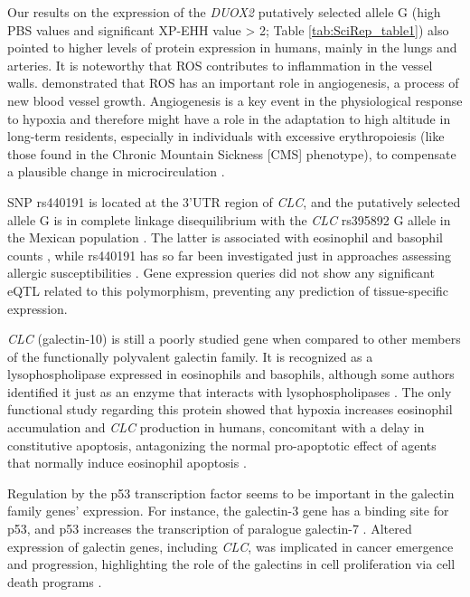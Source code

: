 Our results on the expression of the \textsl{DUOX2} putatively selected allele G (high PBS values and significant XP-EHH value > 2; Table \ref{tab:SciRep_table1}) also pointed to higher levels of protein expression in humans, mainly in the lungs and arteries. It is noteworthy that ROS contributes to inflammation in the vessel walls. \cite{kim_oxidative_2014} demonstrated that ROS has an important role in angiogenesis, a process of new blood vessel growth. Angiogenesis is a key event in the physiological response to hypoxia and therefore might have a role in the adaptation to high altitude in long-term residents, especially in individuals with excessive erythropoiesis (like those found in the Chronic Mountain Sickness [CMS] phenotype), to compensate a plausible change in microcirculation \cite{ge_b-type_2011,buroker_akt3_2012}.

SNP rs440191 is located at the 3'UTR region of \textsl{CLC}, and the putatively selected allele G is in complete linkage disequilibrium with the \textsl{CLC} rs395892 G allele in the Mexican population \cite{the_1000_genomes_project_consortium_integrating_2014}. The latter is associated with eosinophil and basophil counts \cite{1000_genomes_project_consortium_global_2015}, while rs440191 has so far been investigated just in approaches assessing allergic susceptibilities \cite{astle_allelic_2016}. Gene expression queries did not show any significant eQTL related to this polymorphism, preventing any prediction of tissue-specific expression.

\textsl{CLC} (galectin-10) is still a poorly studied gene when compared to other members of the functionally polyvalent galectin family. It is recognized as a lysophospholipase expressed in eosinophils and basophils, although some authors identified it just as an enzyme that interacts with lysophospholipases \cite{ackerman_charcot-leyden_2002}. The only functional study regarding this protein showed that hypoxia increases eosinophil accumulation and \textsl{CLC} production in humans, concomitant with a delay in constitutive apoptosis, antagonizing the normal pro-apoptotic effect of agents that normally induce eosinophil apoptosis \cite{porter_hypoxia_2017}.

Regulation by the p53 transcription factor seems to be important in the galectin family genes’ expression. For instance, the galectin-3 gene has a binding site for p53, and p53 increases the transcription of paralogue galectin-7 \cite{polyak_model_1997,raimond_second_1995,cooper_galectinomics_2002}. Altered expression of galectin genes, including \textsl{CLC}, was implicated in cancer emergence and progression, highlighting the role of the galectins in cell proliferation via cell death programs \cite{gopalan_expression_2016}.

